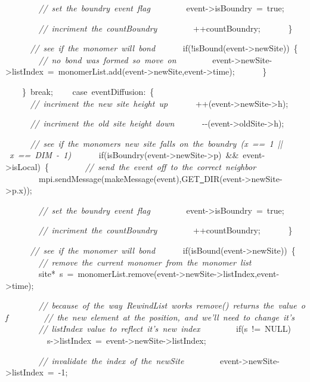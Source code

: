 {\ \ \ \ \ \ \ \ \textsl{//\ set\ the\ boundry\ event\ flag}
\ \ \ \ \ \ \ \ event-{}>{}isBoundry\ =\ true;

\ \ \ \ \ \ \ \ \textsl{//\ incriment\ the\ countBoundry}
\ \ \ \ \ \ \ \ ++countBoundry;
\ \ \ \ \ \ \}

\ \ \ \ \ \ \textsl{//\ see\ if\ the\ monomer\ will\ bond}
\ \ \ \ \ \ if(!isBound(event-{}>{}newSite))\ \{
\ \ \ \ \ \ \ \ \textsl{//\ no\ bond\ was\ formed\ so\ move\ on}
\ \ \ \ \ \ \ \ event-{}>{}newSite-{}>{}listIndex\ =\ monomerList.add(event-{}>{}newSite,event-{}>{}time);
\ \ \ \ \ \ \}

\ \ \ \ \}\ break;
\ \ \ \ case\ eventDiffusion:\ \{
\ \ \ \ \ \ \textsl{//\ incriment\ the\ new\ site\ height\ up}
\ \ \ \ \ \ ++(event-{}>{}newSite-{}>{}h);

\ \ \ \ \ \ \textsl{//\ incriment\ the\ old\ site\ height\ down}
\ \ \ \ \ \ -{}-{}(event-{}>{}oldSite-{}>{}h);

\ \ \ \ \ \ \textsl{//\ see\ if\ the\ monomers\ new\ site\ falls\ on\ the\ boundry\ (x\ ==\ 1\ ||\ x\ ==\ DIM\ -{}\ 1)}
\ \ \ \ \ \ if(isBoundry(event-{}>{}newSite-{}>{}p)\ \&\&\ event-{}>{}isLocal)\ \{
\ \ \ \ \ \ \ \ \textsl{//\ send\ the\ event\ off\ to\ the\ correct\ neighbor}
\ \ \ \ \ \ \ \ mpi.sendMessage(makeMessage(event),GET\underline\ DIR(event-{}>{}newSite-{}>{}p.x));

\ \ \ \ \ \ \ \ \textsl{//\ set\ the\ boundry\ event\ flag}
\ \ \ \ \ \ \ \ event-{}>{}isBoundry\ =\ true;

\ \ \ \ \ \ \ \ \textsl{//\ incriment\ the\ countBoundry}
\ \ \ \ \ \ \ \ ++countBoundry;
\ \ \ \ \ \ \}

\ \ \ \ \ \ \textsl{//\ see\ if\ the\ monomer\ will\ bond}
\ \ \ \ \ \ if(isBound(event-{}>{}newSite))\ \{
\ \ \ \ \ \ \ \ \textsl{//\ remove\ the\ current\ monomer\ from\ the\ monomer\ list}
\ \ \ \ \ \ \ \ site*\ s\ =\ monomerList.remove(event-{}>{}newSite-{}>{}listIndex,event-{}>{}time);

\ \ \ \ \ \ \ \ \textsl{//\ because\ of\ the\ way\ RewindList\ works\ remove()\ returns\ the\ value\ of}
\ \ \ \ \ \ \ \ \textsl{//\ the\ new\ element\ at\ the\ position,\ and\ we'll\ need\ to\ change\ it's}
\ \ \ \ \ \ \ \ \textsl{//\ listIndex\ value\ to\ reflect\ it's\ new\ index}
\ \ \ \ \ \ \ \ if(s\ !=\ NULL)
\ \ \ \ \ \ \ \ \ \ s-{}>{}listIndex\ =\ event-{}>{}newSite-{}>{}listIndex;

\ \ \ \ \ \ \ \ \textsl{//\ invalidate\ the\ index\ of\ the\ newSite}
\ \ \ \ \ \ \ \ event-{}>{}newSite-{}>{}listIndex\ =\ -{}1;

}
